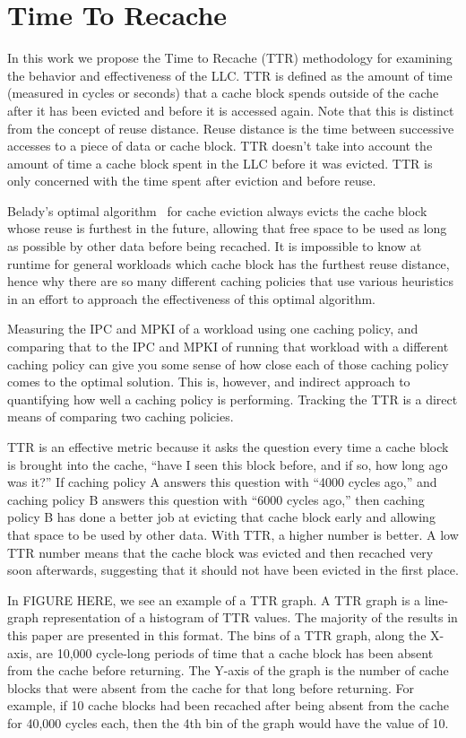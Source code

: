 \section{Time To Recache}

In this work we propose the Time to Recache (TTR) methodology for
examining the behavior and effectiveness of the LLC.  TTR is defined
as the amount of time (measured in cycles or seconds) that a cache
block spends outside of the cache after it has been evicted and
before it is accessed again.  Note that this is distinct from the
concept of reuse distance.  Reuse distance is the time between
successive accesses to a piece of data or cache block.  TTR doesn't
take into account the amount of time a cache block spent in the LLC
before it was evicted.  TTR is only concerned with the time spent
after eviction and before reuse.

Belady's optimal algorithm~\cite{belady66} for cache eviction always
evicts
the cache block whose reuse is furthest in the future, allowing that
free space to be used as long as possible by other data before being
recached.  It is impossible to know at runtime for general workloads
which cache block has the furthest reuse distance, hence why there are
so many different caching policies that use various heuristics in an
effort to approach the effectiveness of this optimal algorithm.

Measuring the IPC and MPKI of a workload using one caching policy, and
comparing that to the IPC and MPKI of running that workload with a
different caching policy can give you some sense of how close each of
those caching policy comes to the optimal solution.  This is,
however, and indirect approach to quantifying how well a caching
policy is performing.  Tracking the TTR is a direct means of
comparing two caching policies.

TTR is an effective metric because it asks the question every time a
cache block is brought into the cache, ``have I seen this block
before, and if so, how long ago was it?''  If caching policy A answers
this question with ``4000 cycles ago,'' and caching policy B answers
this question with ``6000 cycles ago,'' then caching policy B has done
a better job at evicting that cache block early and allowing that
space to be used by other data.  With TTR, a higher number is better.
A low TTR number means that the cache block was evicted and then
recached very soon afterwards, suggesting that it should not have
been evicted in the first place.

In FIGURE HERE, we see an example of a TTR graph.  A TTR graph is a
line-graph representation of a histogram of TTR values.  The majority
of
the results in this paper are presented in this format.  The bins of a
TTR graph, along the X-axis,  are 10,000 cycle-long periods of time
that a cache block has
been absent from the cache before returning.  The Y-axis of the graph
is the number of cache blocks that were absent from the cache for that
long before returning.  For example, if 10 cache blocks had been
recached after being absent from the cache for 40,000 cycles each,
then the 4th bin of the graph would have the value of 10.

